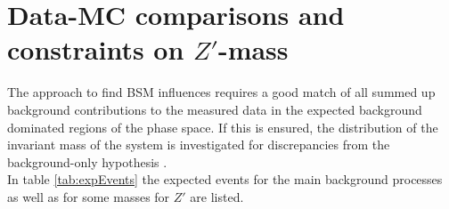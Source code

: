 
\section{Data-MC comparisons and constraints on $Z'$-mass}
The approach to find BSM influences requires a good match of all summed up background contributions to the measured data in the expected background
dominated regions of the phase space. If this is ensured, the distribution of the invariant mass of the system is investigated for discrepancies 
from the background-only hypothesis \cite{anl}. \\
\noindent In table \ref{tab:expEvents} the expected events for the main background processes as well as for some masses for $Z'$ are listed. 
